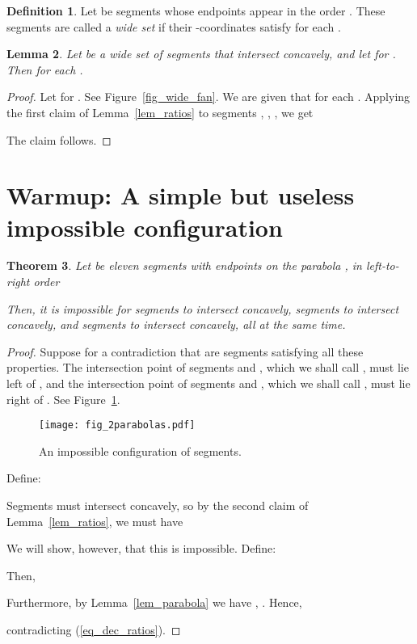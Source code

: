 \documentclass[11pt]{article}
\newtheorem{theorem}{Theorem}[section]
\newtheorem{lemma}[theorem]{Lemma}
\theoremstyle{definition}
\newtheorem{definition}[theorem]{Definition}
\theoremstyle{remark}
\begin{document}
\begin{definition}
Let  be segments whose endpoints appear in the order . These segments are called a \emph{wide set} if their -coordinates satisfy  for each .
\end{definition}

\begin{lemma}\label{lemma_wide_fan}
Let  be a wide set of segments that intersect concavely, and let  for . Then  for each .
\end{lemma}

\begin{proof}
Let  for . See Figure~\ref{fig_wide_fan}. We are given that  for each . Applying the first claim of Lemma~\ref{lem_ratios} to segments , , , we get

The claim follows.
\end{proof}

\section{Warmup: A simple but useless impossible configuration}\label{sec_useless_forbidden}

\begin{theorem}\label{thm_useless_impossible}
Let  be eleven segments with endpoints on the parabola , in left-to-right order

Then, it is impossible for segments  to intersect concavely, segments  to intersect concavely, and segments  to intersect concavely, all at the same time.
\end{theorem}

\begin{proof}
Suppose for a contradiction that  are segments satisfying all these properties. The intersection point of segments  and , which we shall call , must lie left of , and the intersection point of segments  and , which we shall call , must lie right of . See Figure~\ref{fig_2parabolas}.

\begin{figure}
\centerline{\texttt{[image: fig\_2parabolas.pdf]}}
\caption{\label{fig_2parabolas}An impossible configuration of segments.}
\end{figure}

Define:

Segments  must intersect concavely, so by the second claim of Lemma~\ref{lem_ratios}, we must have

We will show, however, that this is impossible.
Define:

Then,

Furthermore, by Lemma~\ref{lem_parabola} we have , . Hence,

contradicting (\ref{eq_dec_ratios}).
\end{proof}
\end{document}

